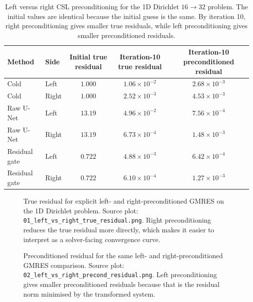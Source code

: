 \begin{table}[htbp]
\centering
\caption{Left versus right CSL preconditioning for the 1D Dirichlet
$16\to32$ problem. The initial values are identical because the initial guess
is the same. By iteration 10, right preconditioning gives smaller true
residuals, while left preconditioning gives smaller preconditioned residuals.}
\label{tab:results-left-right}
\begin{tabular}{llccc}
\toprule
Method & Side & Initial true residual & Iteration-10 true residual
& Iteration-10 preconditioned residual \\
\midrule
Cold & Left & $1.000$ & $1.06\times10^{-2}$ & $2.68\times10^{-3}$ \\
Cold & Right & $1.000$ & $2.52\times10^{-3}$ & $4.53\times10^{-3}$ \\
Raw U-Net & Left & $13.19$ & $4.96\times10^{-2}$ & $7.56\times10^{-4}$ \\
Raw U-Net & Right & $13.19$ & $6.73\times10^{-4}$ & $1.48\times10^{-3}$ \\
Residual gate & Left & $0.722$ & $4.88\times10^{-3}$ & $6.42\times10^{-4}$ \\
Residual gate & Right & $0.722$ & $6.10\times10^{-4}$ & $1.27\times10^{-3}$ \\
\bottomrule
\end{tabular}
\end{table}

\begin{figure}[htbp]
    \centering
    \caption{True residual for explicit left- and right-preconditioned GMRES
    on the 1D Dirichlet problem. Source plot:
    \texttt{01\_left\_vs\_right\_true\_residual.png}. Right preconditioning
    reduces the true residual more directly, which makes it easier to
    interpret as a solver-facing convergence curve.}
    \label{fig:results-left-right-true}
\end{figure}

\begin{figure}[htbp]
    \centering
    \caption{Preconditioned residual for the same left- and
    right-preconditioned GMRES comparison. Source plot:
    \texttt{02\_left\_vs\_right\_precond\_residual.png}. Left
    preconditioning gives smaller preconditioned residuals because that is the
    residual norm minimised by the transformed system.}
    \label{fig:results-left-right-precond}
\end{figure}


